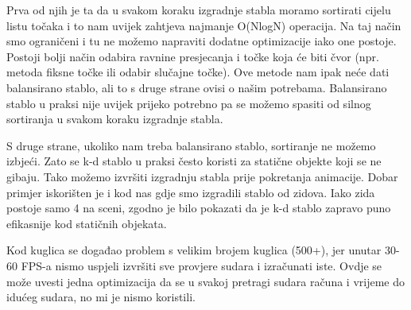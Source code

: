 Prva od njih je ta da u svakom koraku izgradnje stabla moramo sortirati cijelu listu točaka i to nam uvijek zahtjeva najmanje O(NlogN) operacija. Na taj način smo ograničeni i tu ne možemo napraviti dodatne optimizacije iako one postoje. Postoji bolji način odabira ravnine presjecanja i točke koja će biti čvor (npr. metoda fiksne točke ili odabir slučajne točke)\cite{14}. Ove metode nam ipak neće dati balansirano stablo, ali to s druge strane ovisi o našim potrebama. Balansirano stablo u praksi nije uvijek prijeko potrebno pa se možemo spasiti od silnog sortiranja u svakom koraku izgradnje stabla. 

S druge strane, ukoliko nam treba balansirano stablo, sortiranje ne možemo izbjeći. Zato se k-d stablo u praksi često koristi za statične objekte koji se ne gibaju\cite{14}. Tako možemo izvršiti izgradnju stabla prije pokretanja animacije. Dobar primjer iskorišten je i kod nas gdje smo izgradili stablo od zidova. Iako zida postoje samo 4 na sceni, zgodno je bilo pokazati da je k-d stablo zapravo puno efikasnije kod statičnih objekata.

Kod kuglica se događao problem s velikim brojem kuglica (500+), jer unutar 30-60 FPS-a nismo uspjeli izvršiti sve provjere sudara i izračunati iste. Ovdje se može uvesti jedna optimizacija da se u svakoj pretragi sudara računa i vrijeme do idućeg sudara, no mi je nismo koristili.


